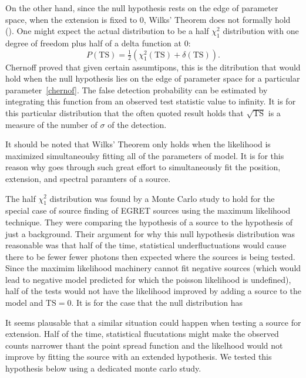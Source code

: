 \documentclass[12pt,preprint]{aastex}
\newcommand{\ts}{\text{TS}\xspace}
\newcommand{\pointlike}{\text{\em pointlike}\xspace}
\begin{document}
On the other hand, since the null hypothesis rests on the edge of
parameter space, when the extension is fixed to 0, Wilks' Theorem does
not formally hold (\cite{warn_wilks_theorem}).  One might
expect the actual distribution to be a half $\chi^2_1$ distribution with
one degree of freedom plus half of a delta function at 0:
\begin{equation}
  P(\ts)=\tfrac{1}{2}(\chi^2_1(\ts)+\delta(\ts)).
\end{equation}
Chernoff proved that given certain assumtipons, this is
the ditribution that would hold when the null hypothesis
lies on the edge of parameter space for a particular parameter~\ref{chernof}.
The false detection probability can be estimated by integrating this function 
from an observed test statistic value to infinity. It is for this
particular distribution that the often quoted result holds that
$\sqrt{\ts}$ is a measure of the number of $\sigma$ of the detection.

It should be noted that Wilks' Theorem only holds when the likelihood
is maximized simultaneoulsy fitting all of the parameters of model. It
is for this reason why \pointlike goes through such great effort to
simultaneously fit the position, extension, and spectral paramters of
a source.

The half $\chi^2_1$ distribution was found by a Monte Carlo study
to hold for the special case of source finding of EGRET sources using the
maximum likelihood technique.  They were comparing the hypothesis of a
source to the hypothesis of just a background\cite{mattox_egret}.
Their argument for why this null hypothesis distribution was reasonable
was that half of the time, statistical underfluctuations would cause
there to be fewer fewer photons then expected where the sources is being
tested. Since the maximim likelihood machinery cannot fit negative
sources (which would lead to negative model predicted for which the
poisson likelihood is undefined), half of the tests would not have the
likelihood improved by adding a source to the model and $\ts=0$.
It is for the case that the null distribution has 

It seems plausable that a similar situation could happen when testing
a source for extension. Half of the time, statistical flucutations might
make the observed counts narrower thant the point spread function and
the likelhood would not improve by fitting the source with an extended
hypothesis. We tested this hypothesis below using a dedicated monte
carlo study.
\end{document}
